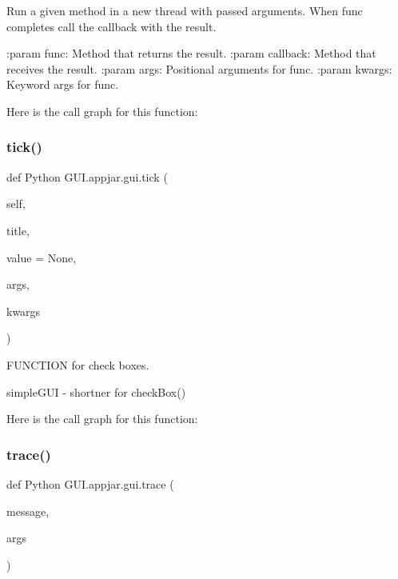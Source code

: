 \begin{DoxyVerb}
\begin{DoxyVerb}Run a given method in a new thread with passed arguments.
   When func completes call the callback with the result.

   :param func: Method that returns the result.
   :param callback: Method that receives the result.
   :param args: Positional arguments for func.
   :param kwargs: Keyword args for func.
\end{DoxyVerb}
 Here is the call graph for this function\+:
\mbox{\label{class_python_01_g_u_i_1_1appjar_1_1gui_a7e3bbb08ee85d2e8d1acc4757f18ede4}} 
\subsubsection{\texorpdfstring{tick()}{tick()}}
{\footnotesize\ttfamily def Python G\+U\+I.\+appjar.\+gui.\+tick (\begin{DoxyParamCaption}\item[{}]{self,  }\item[{}]{title,  }\item[{}]{value = {\ttfamily None},  }\item[{}]{args,  }\item[{}]{kwargs }\end{DoxyParamCaption})}



F\+U\+N\+C\+T\+I\+ON for check boxes. 

\begin{DoxyVerb}simpleGUI - shortner for checkBox() \end{DoxyVerb}
 Here is the call graph for this function\+:
\mbox{\label{class_python_01_g_u_i_1_1appjar_1_1gui_a3e03bea05351523162ba28f136f1523c}} 
\subsubsection{\texorpdfstring{trace()}{trace()}}
{\footnotesize\ttfamily def Python G\+U\+I.\+appjar.\+gui.\+trace (\begin{DoxyParamCaption}\item[{}]{message,  }\item[{}]{args }\end{DoxyParamCaption})\hspace{0.3cm}{\ttfamily [static]}}


\end{DoxyVerb}
